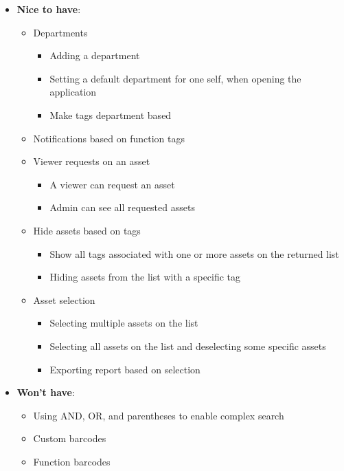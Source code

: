 \begin{itemize}
    \item \textbf{Nice to have}:
        \begin{itemize}
            \item Departments
            \begin{itemize}
                \item Adding a department
                \item Setting a default department for one self, when opening the application
                \item Make tags department based
            \end{itemize}
            \item Notifications based on function tags
            \item Viewer requests on an asset
            \begin{itemize}
                \item A viewer can request an asset
                \item Admin can see all requested assets
            \end{itemize}
            \item Hide assets based on tags
            \begin{itemize}
                \item Show all tags associated with one or more assets on the returned list
                \item Hiding assets from the list with a specific tag
            \end{itemize}
            \item Asset selection
            \begin{itemize}
                \item Selecting multiple assets on the list
                \item Selecting all assets on the list and deselecting some specific assets
                \item Exporting report based on selection
            \end{itemize}
        \end{itemize}
        
    \item \textbf{Won't have}:
        \begin{itemize}
            \item Using AND, OR, and parentheses to enable complex search
            \item Custom barcodes
            \item Function barcodes
        \end{itemize}
\end{itemize}

